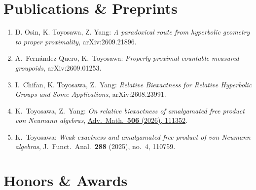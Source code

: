 \documentclass[10pt,a4paper]{article}
\begin{document}



\section*{Publications \& Preprints}

\begin{enumerate}
\item[5.] D. Osin, K. Toyosawa, Z. Yang: \textit{A paradoxical route from hyperbolic geometry to proper proximality}, arXiv:2609.21896.

\item[4.] A.\ Fernández Quero, K.\ Toyosawa: \textit{Properly proximal countable measured groupoids}, arXiv:2609.01253.

\item[3.] I.\ Chifan, K. Toyosawa, Z.\ Yang: \textit{Relative Biexactness for Relative Hyperbolic Groups and Some Applications}, arXiv:2608.23991.

\item[2.] K.\ Toyosawa, Z.\ Yang: \textit{On relative biexactness of amalgamated free product von Neumann algebras}, \href{https://doi.org/10.1016/j.aim.2026.111352}{Adv.\ Math.\ \textbf{506} (2026), 111352}.

\item[1.] K.\ Toyosawa: \textit{Weak exactness and amalgamated free product of von Neumann algebras}, J.\ Funct.\ Anal.\ \textbf{288} (2025), no.\ 4, 110759.


\end{enumerate}





\section*{Honors \& Awards}
\end{document}
